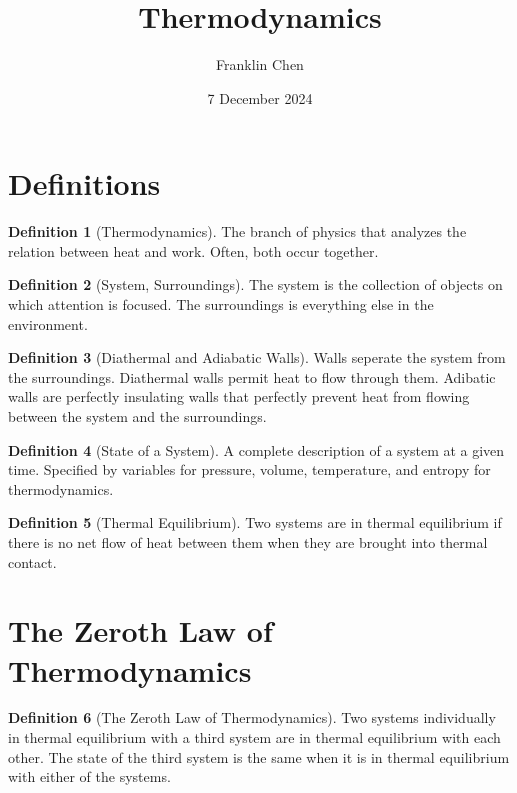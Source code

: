 \documentclass[12pt, a4paper]{article}
\title{Thermodynamics}
\author{Franklin Chen}
\date{7 December 2024}
\theoremstyle{definition}
\newtheorem{definition}{Definition}
\begin{document}
\maketitle
\newpage

\tableofcontents

\section{Definitions}
\begin{definition}[Thermodynamics]
    The branch of physics that analyzes the relation between heat and work. Often, both occur together.
\end{definition}

\begin{definition}[System, Surroundings]
    The system is the collection of objects on which attention is focused.
    The surroundings is everything else in the environment.
\end{definition}

\begin{definition}[Diathermal and Adiabatic Walls]
    Walls seperate the system from the surroundings.
    Diathermal walls permit heat to flow through them.
    Adibatic walls are perfectly insulating walls that perfectly prevent heat from flowing between the system and the surroundings.
\end{definition}

\begin{definition}[State of a System]
    A complete description of a system at a given time.
    Specified by variables for pressure, volume, temperature, and entropy for thermodynamics.
\end{definition}

\begin{definition}[Thermal Equilibrium]
    Two systems are in thermal equilibrium if there is no net flow of heat between them when they are brought into thermal contact.
\end{definition}

\section{The Zeroth Law of Thermodynamics}
\begin{definition}[The Zeroth Law of Thermodynamics]
    Two systems individually in thermal equilibrium with a third system are in thermal equilibrium with each other.
    The state of the third system is the same when it is in thermal equilibrium with either of the systems.
\end{definition}
\end{document}
